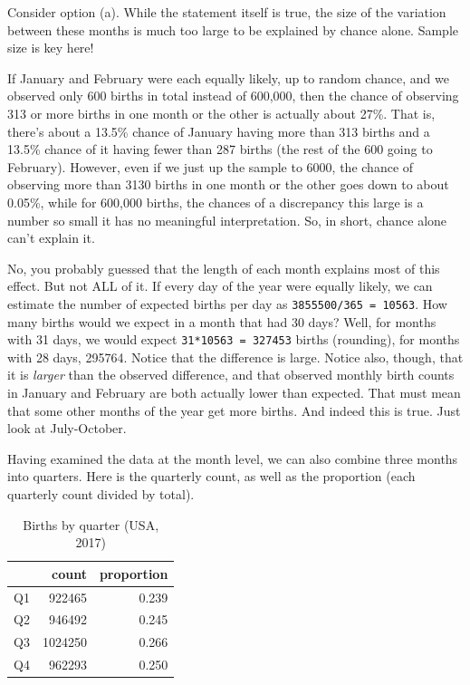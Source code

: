 \documentclass[openany]{book}
\begin{document}
Consider option (a). While the statement itself is true, the size of the variation between these months is much too large to be explained by chance alone. Sample size is key here!

If January and February were each equally likely, up to random chance, and we observed only 600 births in total instead of 600,000, then the chance of observing 313 or more births in one month or the other is actually about 27\%. That is, there's about a 13.5\% chance of January having more than 313 births and a 13.5\% chance of it having fewer than 287 births (the rest of the 600 going to February). However, even if we just up the sample to 6000, the chance of observing more than 3130 births in one month or the other goes down to about 0.05\%, while for 600,000 births, the chances of a discrepancy this large is a number so small it has no meaningful interpretation. So, in short, chance alone can't explain it.

No, you probably guessed that the length of each month explains most of this effect. But not ALL of it. If every day of the year were equally likely, we can estimate the number of expected births per day as \texttt{3855500/365\ =\ 10563}. How many births would we expect in a month that had 30 days? Well, for months with 31 days, we would expect \texttt{31*10563\ =\ 327453} births (rounding), for months with 28 days, 295764. Notice that the difference is large. Notice also, though, that it is \emph{larger} than the observed difference, and that observed monthly birth counts in January and February are both actually lower than expected. That must mean that some other months of the year get more births. And indeed this is true. Just look at July-October.

Having examined the data at the month level, we can also combine three months into quarters. Here is the quarterly count, as well as the proportion (each quarterly count divided by total).

\begin{table}[!h]

\caption{\label{tab:birthquarter}Births by quarter (USA, 2017)}
\centering
\begin{tabular}[t]{lrr}
\toprule
  & count & proportion\\
\midrule
Q1 & 922465 & 0.239\\
Q2 & 946492 & 0.245\\
Q3 & 1024250 & 0.266\\
Q4 & 962293 & 0.250\\
\bottomrule
\end{tabular}
\end{table}
\end{document}
